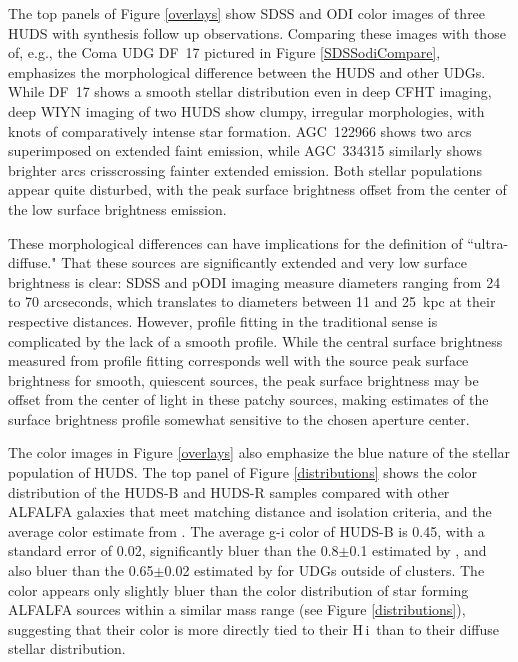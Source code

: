 \documentclass[twocolumn]{aastex6}
\newcommand{\hi}{H{\sc\,i}}
\begin{document}
The top panels of Figure \ref{overlays} show SDSS and ODI color images of three HUDS with synthesis follow up observations. Comparing these images with those of, e.g., the Coma UDG DF~17 pictured in Figure \ref{SDSSodiCompare}, emphasizes the morphological difference between the HUDS and other UDGs. While DF~17 shows a smooth stellar distribution even in deep CFHT imaging, deep WIYN imaging of two HUDS show clumpy, irregular morphologies, with knots of comparatively intense star formation. AGC~122966 shows two arcs superimposed on extended faint emission, while AGC~334315 similarly shows brighter arcs crisscrossing fainter extended emission. Both stellar populations appear quite disturbed, with the peak surface brightness offset from the center of the low surface brightness emission. 

These morphological differences can have implications for the definition of ``ultra-diffuse." That these sources are significantly extended and very low surface brightness is clear: SDSS and pODI imaging measure diameters ranging from 24 to 70 arcseconds, which translates to diameters between 11 and 25~kpc at their respective distances. However, profile fitting in the traditional sense is complicated by the lack of a smooth profile. While the central surface brightness measured from profile fitting corresponds well with the source peak surface brightness for smooth, quiescent sources, the peak surface brightness may be offset from the center of light in these patchy sources, making estimates of the surface brightness profile somewhat sensitive to the chosen aperture center. 

The color images in Figure \ref{overlays} also emphasize the blue nature of the stellar population of HUDS. The top panel of Figure \ref{distributions} shows the color distribution of the HUDS-B and HUDS-R samples compared with other ALFALFA galaxies that meet matching distance and isolation criteria, and the average color estimate from \cite{vandokkum15a}. The average g-i color of HUDS-B is 0.45, with a standard error of 0.02, significantly bluer than the 0.8$\pm$0.1 estimated by \cite{vandokkum15a}, and also bluer than the 0.65$\pm$0.02 estimated by \cite{roman16a} for UDGs outside of clusters. %
The color appears only slightly bluer than the color distribution of star forming ALFALFA sources within a similar mass range (see Figure \ref{distributions}), suggesting that their color is more directly tied to their \hi\ than to their diffuse stellar distribution. 
\end{document}

